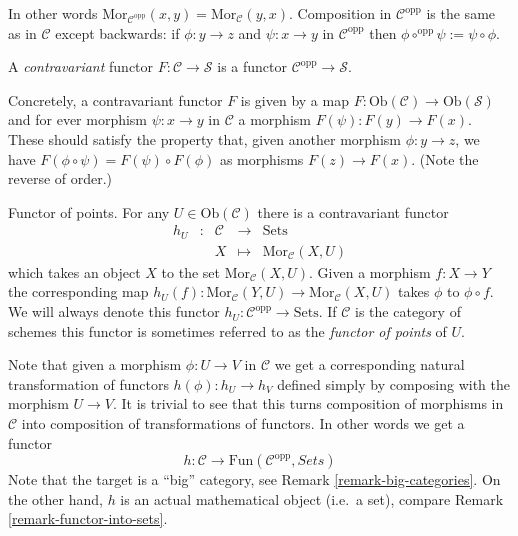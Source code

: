 \noindent
In other
words $\text{Mor}_{\mathcal{C}^{\text{opp}}}(x,y) =
\text{Mor}_{\mathcal{C}}(y,x)$. Composition in $\mathcal{C}^{\text{opp}}$
is the same as in $\mathcal{C}$ except backwards: if $\phi : y \to z$ and
$\psi : x \to y$ in $\mathcal{C}^{\text{opp}}$ then
$\phi \circ^{\text{opp}} \psi := \psi \circ \phi$.

\begin{definition}
A {\it contravariant} functor $F\colon
\mathcal{C}\to \mathcal{S}$ is a functor $\mathcal{C}^{\text{opp}}\to
\mathcal{S}$.
\end{definition}

\noindent
Concretely, a contravariant functor $F$ is given
by a map $F : \text{Ob}(\mathcal{C}) \to 
\text{Ob}(\mathcal{S})$ and for ever morphism
$\psi : x \to y$ in $\mathcal{C}$ a morphism
$F(\psi) : F(y) \to F(x)$. These should satisfy the property
that, given another morphism
$\phi : y \to z$, we have $F(\phi \circ \psi)
= F(\psi) \circ F(\phi)$ as morphisms $F(z) \to F(x)$.
(Note the reverse of order.)

\begin{example}
\label{example-hom-functor}
Functor of points.
For any $U\in \text{Ob}(\mathcal{C})$ there is a contravariant
functor 
$$
\begin{matrix}
h_U & : & \mathcal{C} 
&
\longrightarrow
&
\text{Sets} \\
&&
X
&
\longmapsto
&
\text{Mor}_{\mathcal{C}}(X,U) 
\end{matrix}
$$
which takes an object $X$ to the set
$\text{Mor}_{\mathcal{C}}(X,U)$.
Given a morphism $f\colon X\to Y$ the corresponding map
$h_U(f)\colon
\text{Mor}_{\mathcal{C}}(Y,U)\to \text{Mor}_{\mathcal{C}}(X,U)$ takes
$\phi$ to $\phi\circ f$. We will always denote
this functor $h_U : \mathcal{C}^{\text{opp}} \to \text{Sets}$.
If $\mathcal{C}$ is the category of schemes this functor is
sometimes referred to as the
\emph{functor of points} of $U$.
\end{example}

\noindent
Note that given a morphism $\phi : U \to V$ in $\mathcal{C}$ we get a
corresponding natural transformation of functors
$h(\phi) : h_U \to h_V$ defined simply by composing with the morphism
$U \to V$. It is trivial to see that this turns
composition of morphisms in $\mathcal{C}$ into composition of
transformations of functors. In other words we get a functor
$$
h :
\mathcal{C}
\longrightarrow
\text{Fun}(\mathcal{C}^{\text{opp}}, \textit{Sets})
$$
Note that the target is a ``big'' category, see
Remark \ref{remark-big-categories}. On the other hand,
$h$ is an actual mathematical object (i.e.\ a set), compare Remark
\ref{remark-functor-into-sets}.

